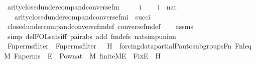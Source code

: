 \begin{isabellebody}
\ arity{\isacharunderscore}{\kern0pt}closed{\isacharunderscore}{\kern0pt}under{\isacharunderscore}{\kern0pt}comp{\isacharunderscore}{\kern0pt}and{\isacharunderscore}{\kern0pt}converse{\isacharunderscore}{\kern0pt}fm\ {\isacharcolon}{\kern0pt}\ \isanewline
\ \ \ i\ \isanewline
\ \ \ {\isachardoublequoteopen}i\ {\isasymin}\ nat{\isachardoublequoteclose}\ \isanewline
\ \ \ {\isachardoublequoteopen}arity{\isacharparenleft}{\kern0pt}closed{\isacharunderscore}{\kern0pt}under{\isacharunderscore}{\kern0pt}comp{\isacharunderscore}{\kern0pt}and{\isacharunderscore}{\kern0pt}converse{\isacharunderscore}{\kern0pt}fm{\isacharparenleft}{\kern0pt}i{\isacharparenright}{\kern0pt}{\isacharparenright}{\kern0pt}\ {\isasymle}\ succ{\isacharparenleft}{\kern0pt}i{\isacharparenright}{\kern0pt}{\isachardoublequoteclose}\ \isanewline
%
\isadelimproof
\ \ %
\endisadelimproof
%
\isatagproof
{}\isamarkupfalse%
\ closed{\isacharunderscore}{\kern0pt}under{\isacharunderscore}{\kern0pt}comp{\isacharunderscore}{\kern0pt}and{\isacharunderscore}{\kern0pt}converse{\isacharunderscore}{\kern0pt}fm{\isacharunderscore}{\kern0pt}def\ converse{\isacharunderscore}{\kern0pt}fm{\isacharunderscore}{\kern0pt}def\isanewline
\ \ \isamarkupfalse%
\ assms\ \isanewline
\ \ \isamarkupfalse%
\ {\isacharparenleft}{\kern0pt}simp\ del{\isacharcolon}{\kern0pt}FOL{\isacharunderscore}{\kern0pt}sats{\isacharunderscore}{\kern0pt}iff\ pair{\isacharunderscore}{\kern0pt}abs\ add{\isacharcolon}{\kern0pt}\ fm{\isacharunderscore}{\kern0pt}defs\ nat{\isacharunderscore}{\kern0pt}simp{\isacharunderscore}{\kern0pt}union{\isacharparenright}{\kern0pt}\isanewline
\ \ \isamarkupfalse%
%
\endisatagproof
{\isafoldproof}%
%
\isadelimproof
\isanewline
%
\endisadelimproof
\isanewline
\isanewline
{}\isamarkupfalse%
\ Fn{\isacharunderscore}{\kern0pt}perms{\isacharunderscore}{\kern0pt}filter\ \ {\isachardoublequoteopen}Fn{\isacharunderscore}{\kern0pt}perms{\isacharunderscore}{\kern0pt}filter\ {\isasymequiv}\ {\isacharbraceleft}{\kern0pt}\ H\ {\isasymin}\ forcing{\isacharunderscore}{\kern0pt}data{\isacharunderscore}{\kern0pt}partial{\isachardot}{\kern0pt}P{\isacharunderscore}{\kern0pt}auto{\isacharunderscore}{\kern0pt}subgroups{\isacharparenleft}{\kern0pt}Fn{\isacharcomma}{\kern0pt}\ Fn{\isacharunderscore}{\kern0pt}leq{\isacharcomma}{\kern0pt}\ M{\isacharcomma}{\kern0pt}\ Fn{\isacharunderscore}{\kern0pt}perms{\isacharparenright}{\kern0pt}{\isachardot}{\kern0pt}\ \ {\isasymexists}E\ {\isasymin}\ Pow{\isacharparenleft}{\kern0pt}nat{\isacharparenright}{\kern0pt}\ {\isasyminter}\ M{\isachardot}{\kern0pt}\ finite{\isacharunderscore}{\kern0pt}M{\isacharparenleft}{\kern0pt}E{\isacharparenright}{\kern0pt}\ {\isasymand}\ Fix{\isacharparenleft}{\kern0pt}E{\isacharparenright}{\kern0pt}\ {\isasymsubseteq}\ H\ {\isacharbraceright}{\kern0pt}{\isachardoublequoteclose}\ \isanewline

\end{isabellebody}
